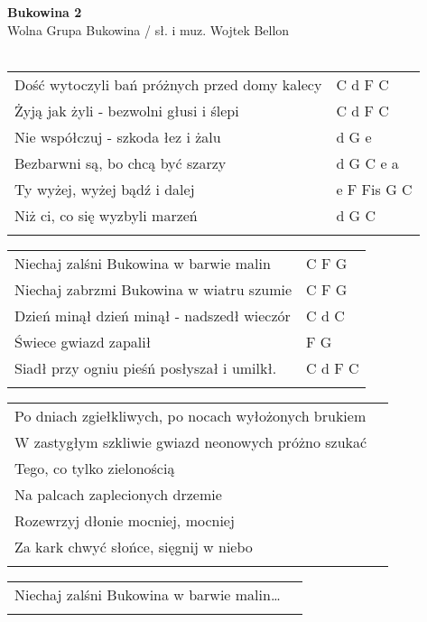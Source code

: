 \documentclass[a5paper]{article}
\begin{document}


\noindent
\fontsize{12pt}{15pt}\selectfont
\textbf{Bukowina 2} \\
\fontsize{8pt}{10pt}\selectfont
Wolna Grupa Bukowina / sł. i muz. Wojtek Bellon  \\ \\
\fontsize{10pt}{12pt}\selectfont
{}
\begin{tabular}{@{}p{8.5cm}p{3cm}@{}}
\noindent
Dość wytoczyli bań próżnych przed domy kalecy & C d F C \\
Żyją jak żyli - bezwolni głusi i ślepi & C d F C \\
Nie współczuj - szkoda łez i żalu & d G e \\
Bezbarwni są, bo chcą być szarzy & d G C e a \\
Ty wyżej, wyżej bądź i dalej & e F Fis G C \\
Niż ci, co się wyzbyli marzeń & d G C \\ \\
\end{tabular}

\noindent
\begin{tabular}{@{}p{7.5cm}p{3cm}@{}}
Niechaj zalśni Bukowina w barwie malin & C F G \\
Niechaj zabrzmi Bukowina w wiatru szumie & C F G \\
Dzień minął dzień minął - nadszedł wieczór & C d C \\
Świece gwiazd zapalił & F G \\
Siadł przy ogniu pieśń posłyszał i umilkł. & C d  F C \\ \\
\end{tabular}

\noindent
\begin{tabular}{@{}p{8.5cm}p{3cm}@{}}
Po dniach zgiełkliwych, po nocach wyłożonych brukiem \\
W zastygłym szkliwie gwiazd neonowych próżno szukać \\
Tego, co tylko zielonością \\
Na palcach zaplecionych drzemie \\
Rozewrzyj dłonie mocniej, mocniej \\
Za kark chwyć słońce, sięgnij w niebo \\ \\
\end{tabular}

\noindent
\begin{tabular}{@{}p{8.5cm}p{3cm}@{}}
Niechaj zalśni Bukowina w barwie malin… \\ \\
\end{tabular}
\end{document}
